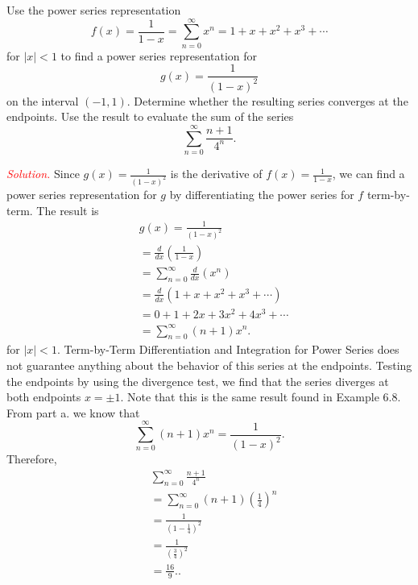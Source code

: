 \documentclass{report}
\begin{document}
    \bigbreak \noindent 
    \begin{exm}
        Use the power series representation
        \[ f(x) = \frac{1}{1-x} = \sum_{n=0}^{\infty} x^n = 1 + x + x^2 + x^3 + \cdots \]
        for \( |x| < 1 \) to find a power series representation for
        \[ g(x) = \frac{1}{(1-x)^2} \]
        on the interval \( (-1,1) \). Determine whether the resulting series converges at the endpoints.
        \bigbreak \noindent 
        Use the result to evaluate the sum of the series 
        \[ \sum_{n=0}^{\infty} \frac{n+1}{4^n}. \]
    \end{exm}

    \pagebreak \bigbreak \noindent 
    \textcolor{red}{\textit{Solution.}} Since \( g(x) = \frac{1}{(1-x)^2} \) is the derivative of \( f(x) = \frac{1}{1-x} \), we can find a power series representation for \( g \) by differentiating the power series for \( f \) term-by-term. The result is
    \begin{align*}
         &g(x) = \frac{1}{(1-x)^2} \\
         &= \frac{d}{dx}\left(\frac{1}{1-x}\right) \\
         &= \sum_{n=0}^{\infty} \frac{d}{dx}(x^n) \\
         &= \frac{d}{dx}(1 + x + x^2 + x^3 + \cdots) \\
         &= 0 + 1 + 2x + 3x^2 + 4x^3 + \cdots \\
         &= \sum_{n=0}^{\infty} (n+1)x^n 
    .\end{align*}
    for \( |x| < 1 \). Term-by-Term Differentiation and Integration for Power Series does not guarantee anything about the behavior of this series at the endpoints. Testing the endpoints by using the divergence test, we find that the series diverges at both endpoints \( x = \pm 1 \).
    Note that this is the same result found in Example 6.8.
    \bigbreak \noindent 
    From part a. we know that
    \[ \sum_{n=0}^{\infty} (n+1)x^n = \frac{1}{(1-x)^2}. \]
    Therefore,
    \begin{align*}
         &\sum_{n=0}^{\infty} \frac{n+1}{4^n}  \\
         &= \sum_{n=0}^{\infty} (n+1)\left(\frac{1}{4}\right)^n  \\
         &= \frac{1}{\left(1-\frac{1}{4}\right)^2}  \\
         &= \frac{1}{\left(\frac{3}{4}\right)^2}  \\
         &= \frac{16}{9}. 
    .\end{align*}
\end{document}
